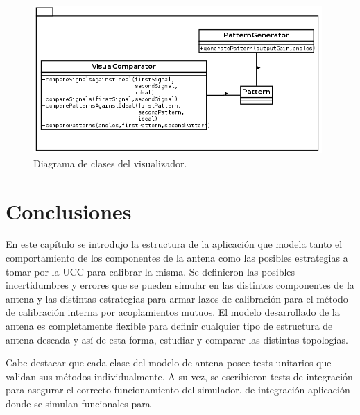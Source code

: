 \begin{figure}[H]
 \centering
 \includegraphics[width=11cm]{gfx/visualPackage.png}
 \caption{Diagrama de clases del visualizador.}
 \label{fig:visualPackage}
\end{figure}


\section{Conclusiones}

En este capítulo se introdujo la estructura de la aplicación que modela tanto el comportamiento de los componentes de la antena
como las posibles estrategias a tomar por la UCC para calibrar la misma. Se definieron las posibles incertidumbres y errores que
se pueden simular en las distintos componentes de la antena y las distintas estrategias para armar lazos de calibración para el 
método de calibración interna por acoplamientos mutuos. El modelo desarrollado de la antena es completamente flexible para
definir cualquier tipo de estructura de antena deseada y así de esta forma, estudiar y comparar las distintas topologías. 

Cabe destacar que cada clase del modelo de antena posee tests unitarios que validan sus métodos individualmente. A su vez, se
escribieron tests de integración para asegurar el correcto funcionamiento del simulador.
de integración aplicación donde se simulan funcionales para 

